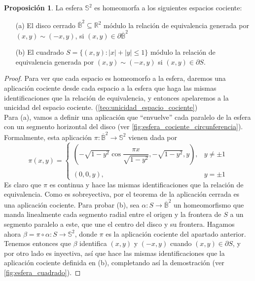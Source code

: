 \documentclass[10pt]{report}
\theoremstyle{definition}
\newtheorem{prop}[defin]{Proposición}
\begin{document}
\begin{prop}%
\label{prop:Esfera como cociente de disco y cuadrado}
La esfera $\mathbb{S}^2$ es homeomorfa a los siguientes espacios cociente: 
\begin{itemize}
\item[(a)] El disco cerrado $\overline{\mathbb{B}}^2\subseteq \mathbb{R}^2$ módulo la relación de equivalencia generada por $(x,y)\sim (-x,y)$, si $(x,y)\in \partial \overline{\mathbb{B}}^2$
\item[(b)] El cuadrado $S=\{(x,y):|x|+|y|\leq 1\}$ módulo la relación de equivalencia generada por $(x,y)\sim(-x,y)$ si $(x,y)\in \partial S$.
\end{itemize}
\end{prop}
\begin{proof}
Para ver que cada espacio es homeomorfo a la esfera, daremos una aplicación cociente desde cada espacio a la esfera que haga las mismas identificaciones que la relación de equivalencia, y entonces apelaremos a la unicidad del espacio cociente. (\autoref{teo:unicidad_espacio_cociente})\\
Para (a), vamos a definir una aplicación que ``envuelve'' cada paralelo de la esfera con un segmento horizontal del disco (ver \autoref{fig:esfera_cociente_circunferencia}).
Formalmente, esta aplicación $\pi:\overline{\mathbb{B}}^2\to \mathbb{S}^2$ vienen dada por 
$$\pi(x,y)=\left\{\begin{array}{lc}
			(-\sqrt{1-y^2} \cos\dfrac{\pi x}{\sqrt{1-y^2}}, -\sqrt{1-y^2}, y), & y\neq \pm 1 \\
			\\(0,0,y), & y=\pm1 

\end{array}
\right.$$
Es claro que $\pi$ es continua y hace las mismas identificaciones que la relación de equivalencia. Como es sobreyectiva, por el teorema de la aplicación cerrada es una aplicación cociente. %
Para probar (b), sea $\alpha:S\to \overline{\mathbb{B}}^2$ un homeomorfismo que manda linealmente cada segmento radial entre el origen y la frontera de $S$ a un segmento paralelo a este, que une el centro del disco y su frontera. Hagamos ahora $\beta=\pi \circ \alpha : S \to \mathbb{S}^2$, donde $\pi$ es la aplicación cociente del apartado anterior. Tenemos entonces que $\beta$ identifica $(x,y)$ y $(-x,y)$ cuando $(x,y)\in \partial S$, y por otro lado es inyectiva, así que hace las mismas identificaciones que la aplicación cociente definida en (b), completando así la demostración (ver \autoref{fig:esfera_cuadrado}). 
\end{proof}
\end{document}
